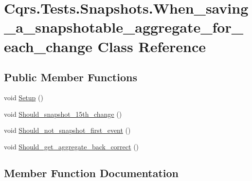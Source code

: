 \hypertarget{classCqrs_1_1Tests_1_1Snapshots_1_1When__saving__a__snapshotable__aggregate__for__each__change}{}\section{Cqrs.\+Tests.\+Snapshots.\+When\+\_\+saving\+\_\+a\+\_\+snapshotable\+\_\+aggregate\+\_\+for\+\_\+each\+\_\+change Class Reference}
\label{classCqrs_1_1Tests_1_1Snapshots_1_1When__saving__a__snapshotable__aggregate__for__each__change}
\subsection*{Public Member Functions}
\begin{DoxyCompactItemize}
\item 
void \hyperlink{classCqrs_1_1Tests_1_1Snapshots_1_1When__saving__a__snapshotable__aggregate__for__each__change_aa446b50b08f2cbc836471526b558d23f}{Setup} ()
\item 
void \hyperlink{classCqrs_1_1Tests_1_1Snapshots_1_1When__saving__a__snapshotable__aggregate__for__each__change_a81e76663141dcb1c2dbe730c8c50eb9e}{Should\+\_\+snapshot\+\_\+15th\+\_\+change} ()
\item 
void \hyperlink{classCqrs_1_1Tests_1_1Snapshots_1_1When__saving__a__snapshotable__aggregate__for__each__change_a2564934da88a06a394930323fe2fb06c}{Should\+\_\+not\+\_\+snapshot\+\_\+first\+\_\+event} ()
\item 
void \hyperlink{classCqrs_1_1Tests_1_1Snapshots_1_1When__saving__a__snapshotable__aggregate__for__each__change_a0bca19df42bb57b1182ceb130a4f925d}{Should\+\_\+get\+\_\+aggregate\+\_\+back\+\_\+correct} ()
\end{DoxyCompactItemize}


\subsection{Member Function Documentation}
\mbox{\label{classCqrs_1_1Tests_1_1Snapshots_1_1When__saving__a__snapshotable__aggregate__for__each__change_aa446b50b08f2cbc836471526b558d23f}} 
